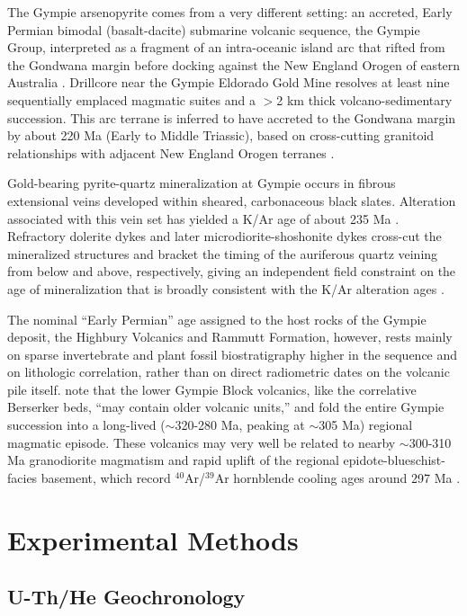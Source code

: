 The Gympie arsenopyrite comes from a very different setting: an accreted,
Early Permian bimodal (basalt-dacite) submarine volcanic sequence, the
Gympie Group, interpreted as a fragment of an intra-oceanic island arc that
rifted from the Gondwana margin before docking against the New England
Orogen of eastern Australia \citep{sivellwaterhouse1988}. Drillcore near
the Gympie Eldorado Gold Mine resolves at least nine sequentially emplaced
magmatic suites and a $>$2 km thick volcano-sedimentary succession. This arc terrane is
inferred to have accreted to the Gondwana margin by about 220 Ma (Early to
Middle Triassic), based on cross-cutting granitoid relationships with
adjacent New England Orogen terranes \citep{sivellmcculloch2001}.

Gold-bearing pyrite-quartz mineralization at Gympie occurs in fibrous extensional veins developed within sheared,
carbonaceous black slates. Alteration associated with this vein set has yielded
a K/Ar age of about 235 Ma \citep{holcombe1997}. Refractory dolerite dykes and later
microdiorite-shoshonite dykes cross-cut the mineralized structures and
bracket the timing of the auriferous quartz veining from below and above,
respectively, giving an independent field constraint on the age of
mineralization that is broadly consistent with the K/Ar alteration ages
\citep{sivellmcculloch2001}.

The nominal ``Early Permian'' age assigned to the host rocks of the Gympie deposit, the Highbury Volcanics and
Rammutt Formation, however, rests mainly on sparse invertebrate and plant
fossil biostratigraphy higher in the sequence and on lithologic
correlation, rather than on direct radiometric dates on the volcanic pile
itself. \citet{holcombe1997} note that the
lower Gympie Block volcanics, like the correlative Berserker beds, ``may
contain older volcanic units,'' and fold the entire Gympie succession into
a long-lived ($\sim$320-280 Ma, peaking at $\sim$305 Ma) regional
magmatic episode. These volcanics may very well be related to nearby $\sim$300-310 Ma 
granodiorite magmatism and rapid uplift of the regional epidote-blueschist-facies basement, 
which record $^{40}$Ar/$^{39}$Ar hornblende cooling ages around 297 Ma \citep{little1995,holcombe1997}.

\section{Experimental Methods}\label{sec:ch3-experimental-methods}

\subsection{U-Th/He Geochronology}\label{sec:ch3-experimental-methods-geochronology}

